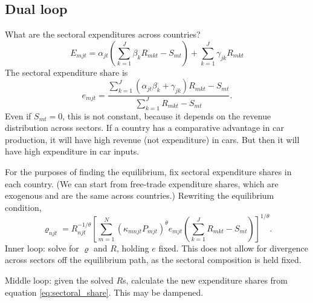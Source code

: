 \documentclass{article}
\begin{document}
\subsection{Dual loop}
What are the sectoral expenditures across countries?
\[
E_{mjt} = 			\alpha_{jt}
			\left(
				\sum_{k=1}^J\beta_k R_{mkt} - S_{mt}
			\right)
			+ \sum_{k=1}^J\gamma_{jk}R_{mkt}
\]
The sectoral expenditure share is
\begin{equation}\label{eq:sectoral_share}
e_{mjt} = \frac
	{\sum_{k=1}^J(\alpha_{jt}\beta_k+\gamma_{jk}) R_{mkt} - S_{mt}}
	{\sum_{k=1}^J R_{mkt}-S_{mt}}.
\end{equation}
Even if $S_{mt}=0$, this is not constant, because it depends on the revenue distribution across sectors. If a country has a comparative advantage in car production, it will have high revenue (not expenditure) in cars. But then it will have high expenditure in car inputs. 

For the purposes of finding the equilibrium, fix sectoral expenditure shares in each country. (We can start from free-trade expenditure shares, which are exogenous and are the same across countries.) Rewriting the equilibrium condition,
\[
	\varrho_{njt} = R_{njt}^{-1/\theta}
	\left[
	\sum_{m=1}^N
		(\kappa_{mnjt} P_{mjt})^{\theta}
		e_{mjt}
		\left(
			\sum_{k=1}^J R_{mkt}
			-S_{mt}
		\right)
	\right]^{1/\theta}.
\]
Inner loop: solve for $\varrho$ and $R$, holding $e$ fixed. This does not allow for divergence across sectors off the equilibrium path, as the sectoral composition is held fixed.

Middle loop: given the solved $R$s, calculate the new expenditure shares from equation \eqref{eq:sectoral_share}. This may be dampened. 
\end{document}

